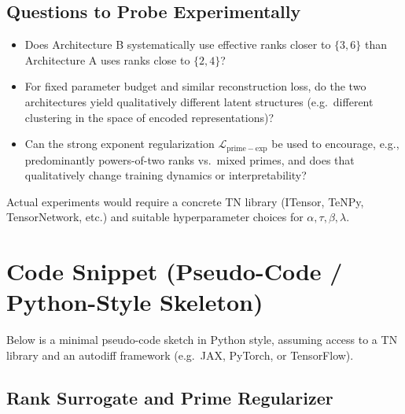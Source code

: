 \documentclass[11pt]{article}
\begin{document}
\subsection{Questions to Probe Experimentally}

\begin{itemize}[leftmargin=1.5em]
    \item Does Architecture B systematically use effective ranks closer to $\{3,6\}$ than Architecture A uses ranks close to $\{2,4\}$?

    \item For fixed parameter budget and similar reconstruction loss, do the two architectures yield qualitatively different latent structures (e.g.\ different clustering in the space of encoded representations)?

    \item Can the strong exponent regularization $\mathcal{L}_{\mathrm{prime-exp}}$ be used to encourage, e.g., predominantly powers-of-two ranks vs.\ mixed primes, and does that qualitatively change training dynamics or interpretability?
\end{itemize}

Actual experiments would require a concrete TN library (ITensor, TeNPy, TensorNetwork, etc.) and suitable hyperparameter choices for $\alpha, \tau, \beta, \lambda$.

\section{Code Snippet (Pseudo-Code / Python-Style Skeleton)}

Below is a minimal pseudo-code sketch in Python style, assuming access to a TN library and an autodiff framework (e.g.\ JAX, PyTorch, or TensorFlow).

\subsection{Rank Surrogate and Prime Regularizer}
\end{document}
